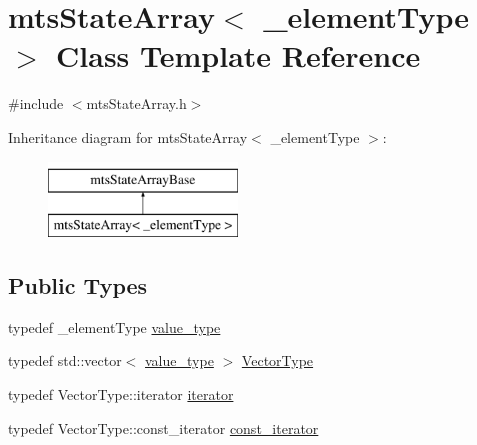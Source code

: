 \hypertarget{classmts_state_array}{}\section{mts\+State\+Array$<$ \+\_\+element\+Type $>$ Class Template Reference}
\label{classmts_state_array}


{\ttfamily \#include $<$mts\+State\+Array.\+h$>$}

Inheritance diagram for mts\+State\+Array$<$ \+\_\+element\+Type $>$\+:\begin{figure}[H]
\begin{center}
\leavevmode
\includegraphics[height=2.000000cm]{d8/dea/classmts_state_array}
\end{center}
\end{figure}
\subsection*{Public Types}
\begin{DoxyCompactItemize}
\item 
typedef \+\_\+element\+Type \hyperlink{classmts_state_array_a1d78f1e353af8687797d4a359b694ee1}{value\+\_\+type}
\item 
typedef std\+::vector$<$ \hyperlink{classmts_state_array_a1d78f1e353af8687797d4a359b694ee1}{value\+\_\+type} $>$ \hyperlink{classmts_state_array_a4d8a41652bc6d14fb99d28c71286058a}{Vector\+Type}
\item 
typedef Vector\+Type\+::iterator \hyperlink{classmts_state_array_ab2a822354bffa12e2d954b4a11847e98}{iterator}
\item 
typedef Vector\+Type\+::const\+\_\+iterator \hyperlink{classmts_state_array_a40a7371d5f45f10e9cd9308cccef0168}{const\+\_\+iterator}
\end{DoxyCompactItemize}
